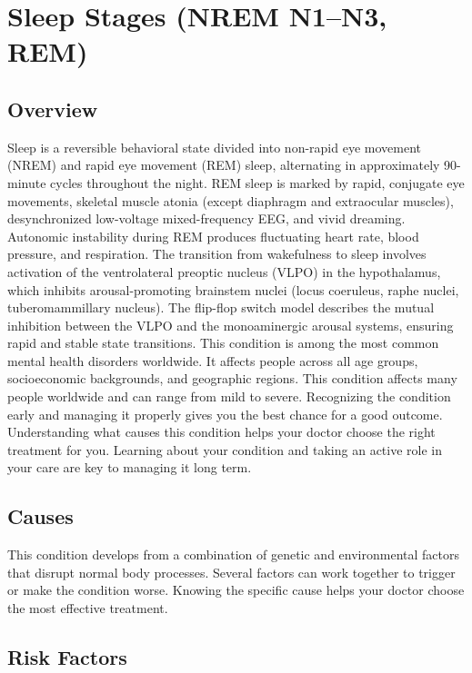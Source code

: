 \chapter{Sleep Stages (NREM N1--N3, REM)}
\label{sec:Sleep Stages}

\section{Overview}
Sleep is a reversible behavioral state divided into non-rapid eye movement (NREM) and rapid eye movement (REM) sleep, alternating in approximately 90-minute cycles throughout the night. REM sleep is marked by rapid, conjugate eye movements, skeletal muscle atonia (except diaphragm and extraocular muscles), desynchronized low-voltage mixed-frequency EEG, and vivid dreaming. Autonomic instability during REM produces fluctuating heart rate, blood pressure, and respiration. The transition from wakefulness to sleep involves activation of the ventrolateral preoptic nucleus (VLPO) in the hypothalamus, which inhibits arousal-promoting brainstem nuclei (locus coeruleus, raphe nuclei, tuberomammillary nucleus). The flip-flop switch model describes the mutual inhibition between the VLPO and the monoaminergic arousal systems, ensuring rapid and stable state transitions. This condition is among the most common mental health disorders worldwide. It affects people across all age groups, socioeconomic backgrounds, and geographic regions. This condition affects many people worldwide and can range from mild to severe. Recognizing the condition early and managing it properly gives you the best chance for a good outcome. Understanding what causes this condition helps your doctor choose the right treatment for you. Learning about your condition and taking an active role in your care are key to managing it long term.

\section{Causes}
This condition develops from a combination of genetic and environmental factors that disrupt normal body processes. Several factors can work together to trigger or make the condition worse. Knowing the specific cause helps your doctor choose the most effective treatment.

\section{Risk Factors}

